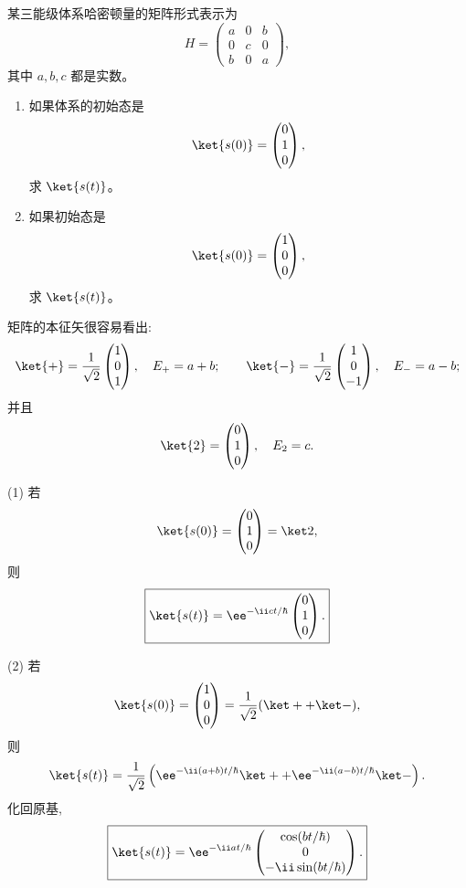 \begin{question}
某三能级体系哈密顿量的矩阵形式表示为
\[
H=\begin{pmatrix}
a&0&b\\
0&c&0\\
b&0&a
\end{pmatrix},
\]
其中 $a,b,c$ 都是实数。
\begin{enumerate}
\item 如果体系的初始态是
\[
\ket{s(0)}=\begin{pmatrix}0\\1\\0\end{pmatrix},
\]
求 $\ket{s(t)}$。
\item 如果初始态是
\[
\ket{s(0)}=\begin{pmatrix}1\\0\\0\end{pmatrix},
\]
求 $\ket{s(t)}$。
\end{enumerate}
\begin{solution}
矩阵的本征矢很容易看出:
\[
\ket{+}=\frac1{\sqrt2}\begin{pmatrix}1\\0\\1\end{pmatrix},
\quad E_+=a+b;
\qquad
\ket{-}=\frac1{\sqrt2}\begin{pmatrix}1\\0\\-1\end{pmatrix},
\quad E_-=a-b;
\]
并且
\[
\ket{2}=\begin{pmatrix}0\\1\\0\end{pmatrix},
\quad E_2=c.
\]

(1) 若
\[
\ket{s(0)}=\begin{pmatrix}0\\1\\0\end{pmatrix}=\ket2,
\]
则
\[
\boxed{\ket{s(t)}=\ee^{-\ii ct/\hbar}\begin{pmatrix}0\\1\\0\end{pmatrix}.}
\]

(2) 若
\[
\ket{s(0)}=\begin{pmatrix}1\\0\\0\end{pmatrix}
=\frac1{\sqrt2}(\ket+ +\ket-),
\]
则
\[
\ket{s(t)}=\frac1{\sqrt2}\left(\ee^{-\ii(a+b)t/\hbar}\ket+
+\ee^{-\ii(a-b)t/\hbar}\ket-\right).
\]
化回原基,
\[
\boxed{\ket{s(t)}=\ee^{-\ii at/\hbar}
\begin{pmatrix}
\cos(bt/\hbar)\\0\\-\ii\sin(bt/\hbar)
\end{pmatrix}.}
\]
\end{solution}
\end{question}

